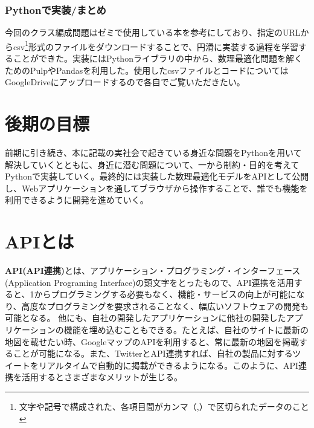 \documentclass{jsarticle}
\begin{document}
\subsubsection{Pythonで実装/まとめ}
今回のクラス編成問題はゼミで使用している本\cite{参考書}を参考にしており、指定のURLからcsv\footnote{文字や記号で構成された、各項目間がカンマ（,）で区切られたデータのこと}形式のファイルをダウンロードすることで、円滑に実装する過程を学習することができた。実装にはPythonライブラリの中から、数理最適化問題を解くためのPulpやPandasを利用した。使用したcsvファイルとコードについてはGoogleDriveにアップロードするので各自でご覧いただきたい。

\newpage

\section{後期の目標}
前期に引き続き、本に記載の実社会で起きている身近な問題をPythonを用いて解決していくとともに、身近に潜む問題について、一から制約・目的を考えてPythonで実装していく。最終的には実装した数理最適化モデルをAPIとして公開し、Webアプリケーションを通してブラウザから操作することで、誰でも機能を利用できるように開発を進めていく。

\vspace\baselineskip	


\section{APIとは}
{\bf API(API連携)}とは、アプリケーション・プログラミング・インターフェース(Application Programing Interface)の頭文字をとったもので、API連携を活用すると、1からプログラミングする必要もなく、機能・サービスの向上が可能になり、高度なプログラミングを要求されることなく、幅広いソフトウェアの開発も可能となる。
他にも、自社の開発したアプリケーションに他社の開発したアプリケーションの機能を埋め込むこともできる。たとえば、自社のサイトに最新の地図を載せたい時、GoogleマップのAPIを利用すると、常に最新の地図を掲載することが可能になる。また、TwitterとAPI連携すれば、自社の製品に対するツイートをリアルタイムで自動的に掲載ができるようになる。このように、API連携を活用するとさまざまなメリットが生じる。
\end{document}
